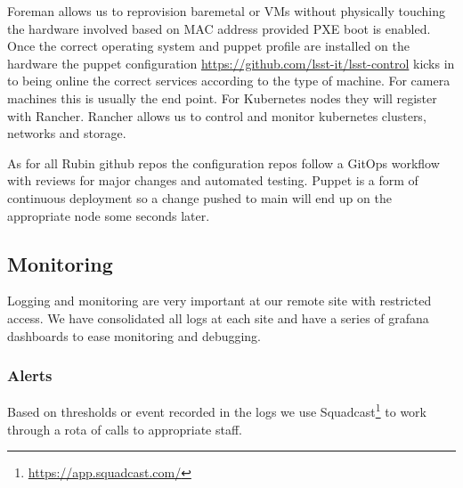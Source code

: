 Foreman allows us to reprovision baremetal or VMs without physically touching the hardware involved based on MAC address provided PXE boot is enabled.
Once the correct operating system and puppet profile are installed on the hardware the puppet configuration {\url{https://github.com/lsst-it/lsst-control}} kicks in to being online the correct services according to the type of machine.
For camera machines this is usually the end point.
For Kubernetes nodes they will register with Rancher.
Rancher allows us to control and monitor kubernetes clusters, networks and storage.

As for all Rubin github repos the configuration repos follow a GitOps workflow with reviews for major changes and automated testing. Puppet is a form of continuous deployment so a change pushed to main will end up on the appropriate node some seconds later.

\subsection{Monitoring}
Logging and monitoring are very important at our remote site with restricted access.
We have consolidated all logs at each site and have a series of grafana dashboards to ease monitoring and debugging.

\subsubsection{Alerts}
Based on thresholds or event recorded in the logs we use Squadcast\footnote{\url{https://app.squadcast.com/}} to work through a rota of calls to appropriate staff.


